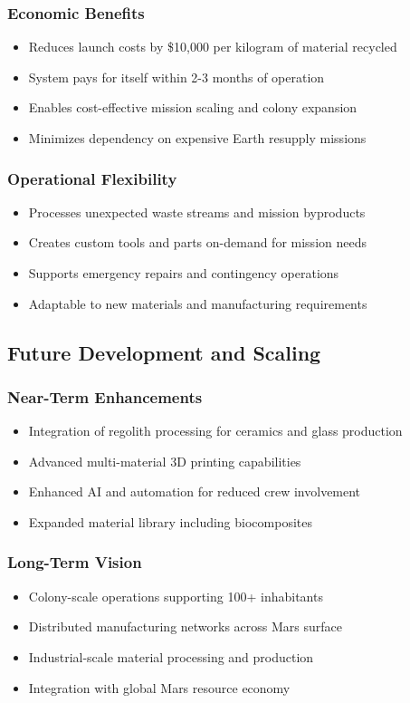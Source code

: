 \documentclass[12pt, a4paper]{article}
\begin{document}
\subsubsection{Economic Benefits}
\begin{itemize}
    \item Reduces launch costs by \$10,000 per kilogram of material recycled
    \item System pays for itself within 2-3 months of operation
    \item Enables cost-effective mission scaling and colony expansion
    \item Minimizes dependency on expensive Earth resupply missions
\end{itemize}

\subsubsection{Operational Flexibility}
\begin{itemize}
    \item Processes unexpected waste streams and mission byproducts
    \item Creates custom tools and parts on-demand for mission needs
    \item Supports emergency repairs and contingency operations
    \item Adaptable to new materials and manufacturing requirements
\end{itemize}

\subsection{Future Development and Scaling}

\subsubsection{Near-Term Enhancements}
\begin{itemize}
    \item Integration of regolith processing for ceramics and glass production
    \item Advanced multi-material 3D printing capabilities
    \item Enhanced AI and automation for reduced crew involvement
    \item Expanded material library including biocomposites
\end{itemize}

\subsubsection{Long-Term Vision}
\begin{itemize}
    \item Colony-scale operations supporting 100+ inhabitants
    \item Distributed manufacturing networks across Mars surface
    \item Industrial-scale material processing and production
    \item Integration with global Mars resource economy
\end{itemize}
\end{document}
